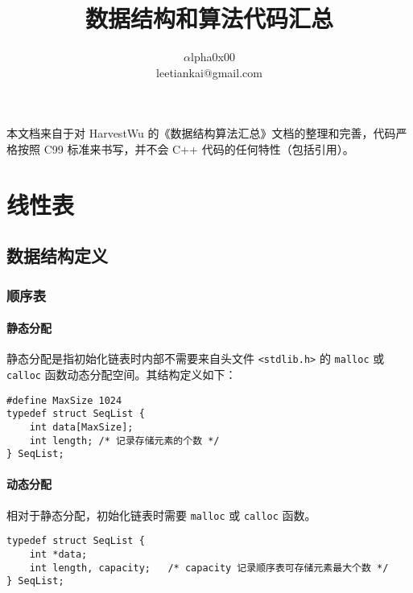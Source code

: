 \documentclass{ctexart}
\title{数据结构和算法代码汇总}
\author{$\alpha$lpha0x00\\leetiankai@gmail.com}
\begin{document}
\maketitle

本文档来自于对 HarvestWu 的《数据结构算法汇总》文档的整理和完善，代码严格按照 C99 标准来书写，并不会 C++ 代码的任何特性（包括引用）。
\newpage

\tableofcontents
\newpage

\section{线性表}

\subsection{数据结构定义}
\subsubsection{顺序表}
\paragraph{静态分配} 静态分配是指初始化链表时内部不需要来自头文件 \texttt{<stdlib.h>} 的 \texttt{malloc} 或 \texttt{calloc} 函数动态分配空间。其结构定义如下：
\begin{verbatim}
#define MaxSize 1024
typedef struct SeqList {
    int data[MaxSize];
    int length; /* 记录存储元素的个数 */
} SeqList;
\end{verbatim}

\paragraph{动态分配} 相对于静态分配，初始化链表时需要 \texttt{malloc} 或 \texttt{calloc} 函数。
\begin{verbatim}
typedef struct SeqList {
    int *data;
    int length, capacity;   /* capacity 记录顺序表可存储元素最大个数 */
} SeqList;
\end{verbatim}
\end{document}
